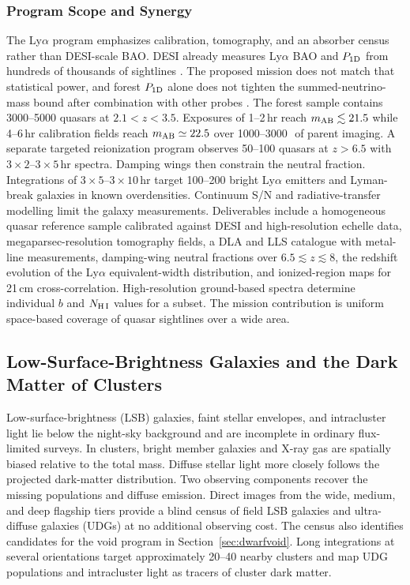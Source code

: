 \subsubsection{Program Scope and Synergy}

The Ly$\alpha$ program emphasizes calibration, tomography, and an absorber census rather than DESI-scale BAO. DESI already measures Ly$\alpha$ BAO and $P_{\rm 1D}$ from hundreds of thousands of sightlines \cite{desi2024lya,karacayli2025}. The proposed mission does not match that statistical power, and forest $P_{\rm 1D}$ alone does not tighten the summed-neutrino-mass bound after combination with other probes \cite{chaves2026}. The forest sample contains 3000--5000 quasars at $2.1<z<3.5$. Exposures of 1--2\,hr reach $m_{\rm AB}\lesssim21.5$ while 4--6\,hr calibration fields reach $m_{\rm AB}\simeq22.5$ over 1000--3000\,\degti\ of parent imaging. A separate targeted reionization program observes 50--100 quasars at $z>6.5$ with $3\times2$--$3\times5$\,hr spectra. Damping wings then constrain the neutral fraction. Integrations of $3\times5$--$3\times10$\,hr target 100--200 bright Ly$\alpha$ emitters and Lyman-break galaxies in known overdensities. Continuum S/N and radiative-transfer modelling limit the galaxy measurements. Deliverables include a homogeneous quasar reference sample calibrated against DESI and high-resolution echelle data, megaparsec-resolution tomography fields, a DLA and LLS catalogue with metal-line measurements, damping-wing neutral fractions over $6.5\lesssim z\lesssim8$, the redshift evolution of the Ly$\alpha$ equivalent-width distribution, and ionized-region maps for 21\,cm cross-correlation. High-resolution ground-based spectra determine individual $b$ and $N_{\rm H\,I}$ values for a subset. The mission contribution is uniform space-based coverage of quasar sightlines over a wide area.

\subsection{Low-Surface-Brightness Galaxies and the Dark Matter of Clusters}\label{sec:lsb}

Low-surface-brightness (LSB) galaxies, faint stellar envelopes, and intracluster light lie below the night-sky background and are incomplete in ordinary flux-limited surveys. In clusters, bright member galaxies and X-ray gas are spatially biased relative to the total mass. Diffuse stellar light more closely follows the projected dark-matter distribution. Two observing components recover the missing populations and diffuse emission. Direct images from the wide, medium, and deep flagship tiers provide a blind census of field LSB galaxies and ultra-diffuse galaxies (UDGs) at no additional observing cost. The census also identifies candidates for the void program in Section~\ref{sec:dwarfvoid}. Long integrations at several orientations target approximately 20--40 nearby clusters and map UDG populations and intracluster light as tracers of cluster dark matter.

